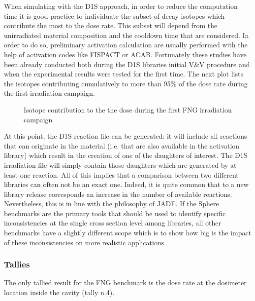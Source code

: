 \documentclass[letterpaper,10pt,english]{sphinxmanual}
\let\sphinxpxdimen\pdfpxdimen\else\newdimen\sphinxpxdimen
\begin{document}
When simulating with the D1S approach, in order to reduce the computation time it is good practice
to individuate the subset of decay isotopes which contribute the most to the dose rate. This
subset will depend from the unirradiated material composition and the cool\sphinxhyphen{}down time that are considered.
In order to do so, preliminary activation calculation are usually performed with the help of
activation codes like FISPACT or ACAB. Fortunately these studies have been already conducted
both during the D1S libraries initial V\&V procedure and when the experimental results were tested for
the first time. The next plot lists the isotopes
contributing cumulatively to more than 95\% of the dose rate during the first irradiation campaign.

\begin{figure}[htbp]
\centering
\capstart

\noindent\sphinxincludegraphics[width=600\sphinxpxdimen]{{daughtersFNG}.png}
\caption{Isotope contribution to the the dose during the first FNG irradiation campaign}\label{\detokenize{usage/benchmarks:id37}}\end{figure}

At this point, the D1S reaction file can be generated: it will include all reactions that can
originate in the material (i.e. that are also available in the activation library) which result
in the creation of one of the daughters of interest. The D1S irradiation file will simply
contain those daughters which are generated by at least one reaction. All of this implies that
a comparison between two different libraries can often not be an exact one. Indeed, it is quite
common that to a new library release corresponds an increase in the number of available reactions.
Nevertheless, this is in line with the philosophy of JADE. If the Sphere benchmarks are the
primary tools that should be used to identify specific inconsistencies at the single cross section
level among libraries, all other benchmarks have a slightly different scope which is to show how
big is the impact of these inconsistencies on more realistic applications.


\subsubsection{Tallies}
\label{\detokenize{usage/benchmarks:id15}}
The only tallied result for the FNG benchmark is the dose rate at the dosimeter location inside the cavity (tally n.4).


\end{document}

